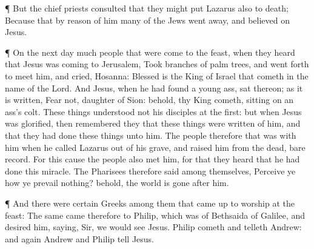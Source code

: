  ¶ But the chief priests consulted that they might put
Lazarus also to death;  Because that by reason of him many
of the Jews went away, and believed on Jesus.

 ¶ On the next day much people that were come to the feast,
when they heard that Jesus was coming to Jerusalem,  Took
branches of palm trees, and went forth to meet him, and cried, Hosanna:
Blessed is the King of Israel that cometh in the name of the Lord.
 And Jesus, when he had found a young ass, sat thereon; as
it is written,  Fear not, daughter of Sion: behold, thy
King cometh, sitting on an ass's colt.  These things
understood not his disciples at the first: but when Jesus was glorified,
then remembered they that these things were written of him, and that
they had done these things unto him.  The people therefore
that was with him when he called Lazarus out of his grave, and raised
him from the dead, bare record.  For this cause the people
also met him, for that they heard that he had done this miracle.
 The Pharisees therefore said among themselves, Perceive ye
how ye prevail nothing? behold, the world is gone after him.

 ¶ And there were certain Greeks among them that came up to
worship at the feast:  The same came therefore to Philip,
which was of Bethsaida of Galilee, and desired him, saying, Sir, we
would see Jesus.  Philip cometh and telleth Andrew: and
again Andrew and Philip tell Jesus.

